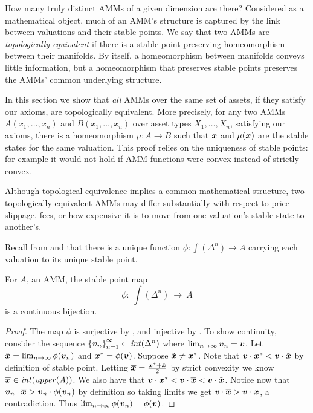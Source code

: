How many truly distinct AMMs of a given dimension are there?
Considered as a mathematical object,
much of an AMM's structure is captured by the link between valuations and their stable points.
We say that two AMMs are \emph{topologically equivalent}
if there is a stable-point preserving homeomorphism between their manifolds.
By itself, a homeomorphism between manifolds conveys little information,
but a homeomorphism that preserves stable points preserves the AMMs' common underlying structure.

In this section we show that \emph{all} AMMs over the same set of assets,
if they satisfy our axioms, are topologically equivalent.
More precisely,
for any two AMMs $A(x_1,\ldots,x_n)$ and $B(x_1,\ldots,x_n)$ over asset types
$X_1, \ldots, X_n$, satisfying our axioms,
there is a homeomorphism $\mu: A \to B$
such that ${\boldsymbol x}$ and $\mu({\boldsymbol x})$ are the stable states for the same valuation.
This proof relies on the uniqueness of stable points:
for example it would not hold if AMM functions were convex
instead of strictly convex.

Although topological equivalence implies a common mathematical structure,
two topologically equivalent AMMs may differ substantially
with respect to price slippage, fees,
or how expensive it is to move from one valuation's stable state to another's.

Recall from  and 
that there is a unique function $\phi: \int(\Delta^n) \to A$
carrying each valuation to its unique stable point.

\begin{lemma}%
\sloppy
For $A$, an AMM,
the stable point map
\begin{equation*}
    \phi:~\int(\Delta^n)~\to~A
\end{equation*}
is a continuous bijection.
\end{lemma}

\begin{proof}
The map $\phi$ is surjective by ,
and injective by .
To show continuity,
consider the sequence
$\left\{ {\boldsymbol v}_n \right\}_{n=1}^{\infty} \subset \mathit{int}(\Delta^n)$ where $\lim_{n \to \infty}{\boldsymbol v}_n = {\boldsymbol v}$.
Let $\tilde{{\boldsymbol x}} = \lim_{n \to \infty} \phi({\boldsymbol v}_n)$ and ${\boldsymbol x}^{*} = \phi({\boldsymbol v})$.
  Suppose $\tilde{{\boldsymbol x}} \neq {\boldsymbol x}^{*}$.
  Note that ${\boldsymbol v} \cdot {\boldsymbol x}^{*} < {\boldsymbol v} \cdot \tilde{{\boldsymbol x}}$ by definition of stable point.
  Letting $\overline{{\boldsymbol x}} = \frac{{\boldsymbol x}^{*} + \tilde{{\boldsymbol x}}}{2}$ by strict convexity we know $\overline{{\boldsymbol x}} \in \mathit{int}(\mathit{upper}(A))$.
  We also have that ${\boldsymbol v} \cdot {\boldsymbol x}^{*} < {\boldsymbol v} \cdot \overline{{\boldsymbol x}} < {\boldsymbol v} \cdot \tilde{{\boldsymbol x}}$.
  Notice now that ${\boldsymbol v}_n \cdot \overline{{\boldsymbol x}} > {\boldsymbol v}_n \cdot \phi({\boldsymbol v}_n)$ by definition so taking limits we get
  ${\boldsymbol v} \cdot \overline{{\boldsymbol x}} > {\boldsymbol v} \cdot \tilde{{\boldsymbol x}}$, a contradiction.
  Thus $\lim_{n \to \infty} \phi({\boldsymbol v}_n) = \phi({\boldsymbol v})$.
\end{proof}

